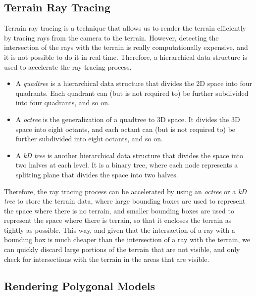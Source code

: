 \subsection{Terrain Ray Tracing}

Terrain ray tracing is a technique that allows us to render the terrain efficiently by tracing rays from the camera to the terrain. However, detecting the intersection of the rays with the terrain is really computationally expensive, and it is not possible to do it in real time. Therefore, a hierarchical data structure is used to accelerate the ray tracing process.
\begin{itemize}
    \item A \emph{quadtree} is a hierarchical data structure that divides the 2D space into four quadrants. Each quadrant can (but is not required to) be further subdivided into four quadrants, and so on.
    \item A \emph{octree} is the generalization of a quadtree to 3D space. It divides the 3D space into eight octants, and each octant can (but is not required to) be further subdivided into eight octants, and so on.
    \item A \emph{kD tree} is another hierarchical data structure that divides the space into two halves at each level. It is a binary tree, where each node represents a splitting plane that divides the space into two halves.
\end{itemize}

Therefore, the ray tracing process can be accelerated by using an \emph{octree} or a \emph{kD tree} to store the terrain data, where large bounding boxes are used to represent the space where there is no terrain, and smaller bounding boxes are used to represent the space where there is terrain, so that it encloses the terrain as tightly as possible. This way, and given that the intersaction of a ray with a bounding box is much cheaper than the intersection of a ray with the terrain, we can quickly discard large portions of the terrain that are not visible, and only check for intersections with the terrain in the areas that are visible.



\subsection{Rendering Polygonal Models}

